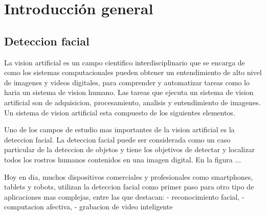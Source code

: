 
\chapter{Introducción general} %

\label{Chapter1} %
\label{IntroGeneral}


\newcommand{\keyword}[1]{\textbf{#1}}
\newcommand{\tabhead}[1]{\textbf{#1}}
\newcommand{\code}[1]{\texttt{#1}}
\newcommand{\file}[1]{\texttt{\bfseries#1}}
\newcommand{\option}[1]{\texttt{\itshape#1}}
\newcommand{\grados}{$^{\circ}$}



\section{Deteccion facial}
La vision artificial es un campo cientifico interdisciplinario que se encarga de como los sistemas computacionales pueden obtener un entendimiento de alto nivel de imagenes y videos digitales, para comprender y automatizar tareas como lo haria un sistema de vision humano. Las tareas que ejecuta un sistema de vision artificial son de adquisicion, procesamiento, analisis y entendimiento de imagenes. Un sistema de vision artificial esta compuesto de los siguientes elementos.


Uno de los campos de estudio mas importantes de la vision artificial es la deteccion facial. La deteccion facial puede ser considerada como un caso particular de la deteccion de objetos y tiene los objetivos de detectar y localizar todos los rostros humanos contenidos en una imagen digital. En la figura ...


Hoy en dia, muchos dispositivos comerciales y profesionales como smartphones, tablets y robots, utilizan la deteccion facial como primer paso para otro tipo de aplicaciones mas complejas, entre las que destacan:
- reconocimiento facial,
- computacion afectiva,
- grabacion de video inteligente


